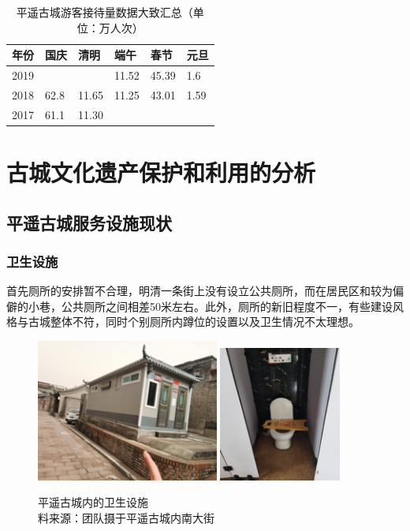 \documentclass[UTF8]{ctexart}
\begin{document}
    \begin{table}[H]
        \centering
        \caption{平遥古城游客接待量数据大致汇总（单位：万人次）}
        \begin{tabular}{p{2cm}p{2cm}p{2cm}p{2cm}p{2cm}p{2cm}}
            \toprule
            年份 & 国庆&清明&端午&春节&元旦\\ 
            \midrule
            2019& & & 11.52 & 45.39 & 1.6\\ 
            2018& 62.8 & 11.65 & 11.25 & 43.01 & 1.59 \\ 
            2017& 61.1 & 11.30 & & & \\ 
            \bottomrule
        \end{tabular}
    \end{table} 
\section{古城文化遗产保护和利用的分析}
    \subsection{平遥古城服务设施现状}
        \subsubsection{卫生设施}
        首先厕所的安排暂不合理，明清一条街上没有设立公共厕所，而在居民区和较为偏僻的小巷，公共厕所之间相差50米左右。此外，厕所的新旧程度不一，有些建设风格与古城整体不符，同时个别厕所内蹲位的设置以及卫生情况不太理想。
        \begin{figure}[H]
            \centering
            \includegraphics[width=6cm]{图片 1.png}
            \includegraphics[width=4cm]{图片 3.png}
            \caption{平遥古城内的卫生设施\\料来源：团队摄于平遥古城内南大街}
            \label{fig:my_label}
        \end{figure}
\end{document}
